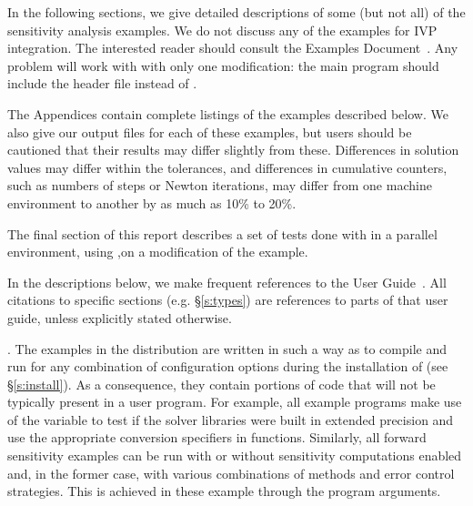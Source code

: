 \vspace{0.2in}\noindent 
In the following sections, we give detailed descriptions of some (but
not all) of the sensitivity analysis examples. We do not discuss any of the 
examples for IVP integration. The interested reader should consult the
{\cvode} Examples Document~\cite{cvode2.2.0_ex}. Any {\cvode} problem
will work with {\cvodes} with only one modification: the main program
should include the header file  instead of .

The Appendices contain complete listings
of the examples described below.  We also give our output files for
each of these examples, but users should be cautioned that their
results may differ slightly from these.  Differences in solution
values may differ within the tolerances, and differences in cumulative
counters, such as numbers of steps or Newton iterations, may differ
from one machine environment to another by as much as 10\% to 20\%.

The final section of this report describes a set of tests done with
{\cvodes} in a parallel environment, using {\nvecp},on a modification of
the  example.

In the descriptions below, we make frequent references to the {\cvodes}
User Guide~\cite{cvodes2.1.0_ug}.  All citations to specific sections
(e.g. \S\ref{s:types}) are references to parts of that user guide, unless
explicitly stated otherwise.

\vspace{0.2in}. 
The examples in the {\cvodes} distribution are written in such a way as
to compile and run for any combination of configuration options during
the installation of {\sundials} (see \S\ref{s:install}). As a consequence,
they contain portions of code that will not be typically present in a
user program. For example, all example programs make use of the
variable  to test if the solver libraries
were built in extended precision and use the appropriate conversion 
specifiers in  functions. Similarly, all forward sensitivity
examples can be run with or without sensitivity computations enabled and,
in the former case, with various combinations of methods and error control 
strategies. This is achieved in these example through the program arguments.

